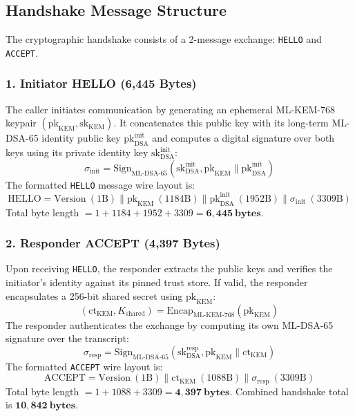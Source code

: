 \subsection{Handshake Message Structure}
The cryptographic handshake consists of a 2-message exchange: \texttt{HELLO} and \texttt{ACCEPT}.

\subsubsection{1. Initiator HELLO (6,445 Bytes)}
The caller initiates communication by generating an ephemeral ML-KEM-768 keypair $(\text{pk}_{\text{KEM}}, \text{sk}_{\text{KEM}})$. It concatenates this public key with its long-term ML-DSA-65 identity public key $\text{pk}_{\text{DSA}}^{\text{init}}$ and computes a digital signature over both keys using its private identity key $\text{sk}_{\text{DSA}}^{\text{init}}$:
\begin{equation}
    \sigma_{\text{init}} = \text{Sign}_{\text{ML-DSA-65}}(\text{sk}_{\text{DSA}}^{\text{init}}, \text{pk}_{\text{KEM}} \parallel \text{pk}_{\text{DSA}}^{\text{init}})
\end{equation}
The formatted \texttt{HELLO} message wire layout is:
\begin{equation}
    \text{HELLO} = \text{Version}\ (1\text{B}) \parallel \text{pk}_{\text{KEM}}\ (1184\text{B}) \parallel \text{pk}_{\text{DSA}}^{\text{init}}\ (1952\text{B}) \parallel \sigma_{\text{init}}\ (3309\text{B})
\end{equation}
Total byte length $= 1 + 1184 + 1952 + 3309 = \mathbf{6,445\ \text{bytes}}$.

\subsubsection{2. Responder ACCEPT (4,397 Bytes)}
Upon receiving \texttt{HELLO}, the responder extracts the public keys and verifies the initiator's identity against its pinned trust store. If valid, the responder encapsulates a 256-bit shared secret using $\text{pk}_{\text{KEM}}$:
\begin{equation}
    (\text{ct}_{\text{KEM}}, K_{\text{shared}}) = \text{Encap}_{\text{ML-KEM-768}}(\text{pk}_{\text{KEM}})
\end{equation}
The responder authenticates the exchange by computing its own ML-DSA-65 signature over the transcript:
\begin{equation}
    \sigma_{\text{resp}} = \text{Sign}_{\text{ML-DSA-65}}(\text{sk}_{\text{DSA}}^{\text{resp}}, \text{pk}_{\text{KEM}} \parallel \text{ct}_{\text{KEM}})
\end{equation}
The formatted \texttt{ACCEPT} wire layout is:
\begin{equation}
    \text{ACCEPT} = \text{Version}\ (1\text{B}) \parallel \text{ct}_{\text{KEM}}\ (1088\text{B}) \parallel \sigma_{\text{resp}}\ (3309\text{B})
\end{equation}
Total byte length $= 1 + 1088 + 3309 = \mathbf{4,397\ \text{bytes}}$. Combined handshake total is $\mathbf{10,842\ \text{bytes}}$.

